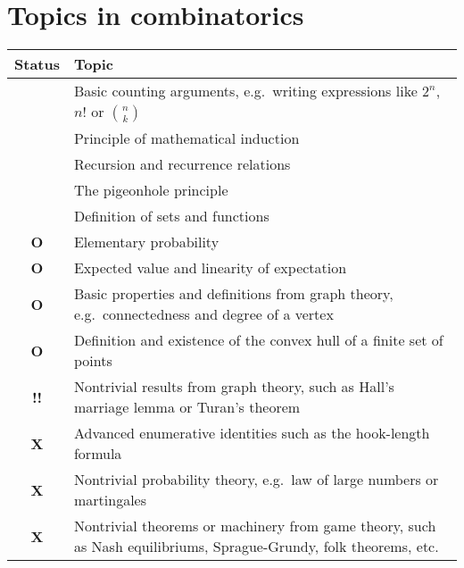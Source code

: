\documentclass[11pt]{scrartcl}
\providecommand{\isRq}{{\color{green!60!black}\CheckmarkBold}}
\providecommand{\isUs}{{\color{cyan}\sffamily\bfseries O}}
\providecommand{\isAv}{{\color{gray}\sffamily\bfseries !!}}
\providecommand{\isEx}{{\color{red}\sffamily\bfseries X}}
\begin{document}
\section{Topics in combinatorics}
\begin{center}
	\begin{tabular}{cp{12cm}}
	\toprule Status & Topic \\ \midrule
	\isRq & Basic counting arguments, e.g.\
		writing expressions like $2^n$, $n!$ or $\binom nk$ \\
	\isRq & Principle of mathematical induction \\
	\isRq & Recursion and recurrence relations \\
	\isRq & The pigeonhole principle \\
	\isRq & Definition of sets and functions \\
	\isUs & Elementary probability \\
	\isUs & Expected value and linearity of expectation \\
	\isUs & Basic properties and definitions from graph theory,
		e.g.\ connectedness and degree of a vertex \\
	\isUs & Definition and existence of the convex hull of a finite set of points \\
	\isAv & Nontrivial results from graph theory,
		such as Hall's marriage lemma or Turan's theorem \\
	\isEx & Advanced enumerative identities such as the hook-length formula \\
	\isEx & Nontrivial probability theory, e.g.\ law of large numbers or martingales \\
	\isEx & Nontrivial theorems or machinery from game theory,
		such as Nash equilibriums, Sprague-Grundy, folk theorems, etc. \\
	\bottomrule
	\end{tabular}
\end{center}
\end{document}
